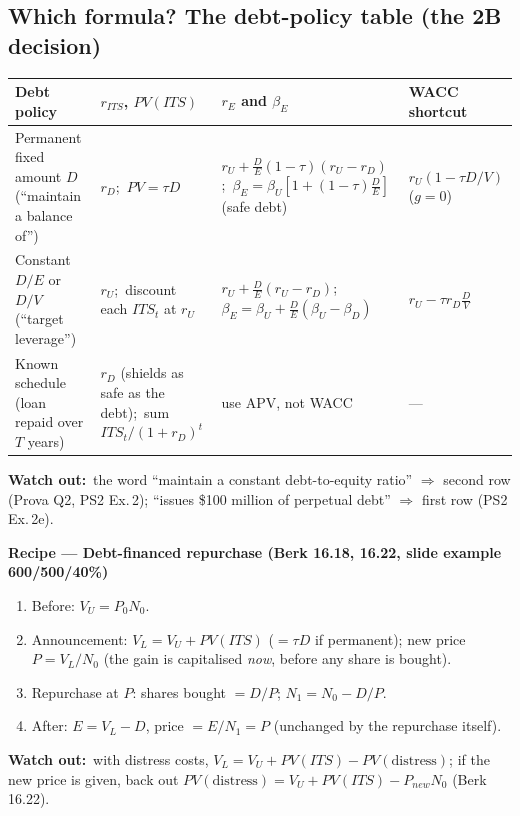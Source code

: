 \documentclass[10pt,a4paper]{article}
\newcommand{\blk}[1]{\subsection*{\color{hd}#1}}
\newcommand{\recipe}[1]{\par\smallskip\noindent\textbf{\color{hd}Recipe --- #1}\par}
\newcommand{\watch}{\par\noindent\textbf{\color{wr}Watch out:}~}
\begin{document}
\blk{Which formula? The debt-policy table (the 2B decision)}
\begin{center}\small
\begin{tabularx}{\linewidth}{@{}>{\raggedright\arraybackslash}p{3.4cm}>{\raggedright\arraybackslash}p{3.6cm}Y>{\raggedright\arraybackslash}p{2.5cm}@{}}
  \toprule
  Debt policy & $r_{ITS}$, $PV(ITS)$ & $r_E$ and $\beta_E$ & WACC shortcut \\ \midrule
  Permanent fixed amount $D$ (``maintain a balance of'') & $r_D$;\ $PV=\tau D$ &
  $r_U+\frac DE(1-\tau)(r_U-r_D)$;\ $\beta_E=\beta_U[1+(1-\tau)\frac DE]$ (safe debt) &
  $r_U(1-\tau D/V)$ ($g=0$) \\[2pt]
  Constant $D/E$ or $D/V$ (``target leverage'') & $r_U$;\ discount each $ITS_t$ at $r_U$ &
  $r_U+\frac DE(r_U-r_D)$;\ $\beta_E=\beta_U+\frac DE(\beta_U-\beta_D)$ &
  $r_U-\tau r_D\frac DV$ \\[2pt]
  Known schedule (loan repaid over $T$ years) & $r_D$ (shields as safe as the debt);\ sum
  $ITS_t/(1+r_D)^t$ & use APV, not WACC & --- \\ \bottomrule
\end{tabularx}
\end{center}
\watch the word ``maintain a constant debt-to-equity ratio'' $\Rightarrow$ second row (Prova Q2, PS2
Ex.\,2); ``issues \$100 million of perpetual debt'' $\Rightarrow$ first row (PS2 Ex.\,2e).

\recipe{Debt-financed repurchase (Berk 16.18, 16.22, slide example 600/500/40\%)}
\begin{enumerate}
  \item Before: $V_U=P_0N_0$.
  \item Announcement: $V_L=V_U+PV(ITS)$ ($=\tau D$ if permanent); new price
        $P=V_L/N_0$ (the gain is capitalised \emph{now}, before any share is bought).
  \item Repurchase at $P$: shares bought $=D/P$; $N_1=N_0-D/P$.
  \item After: $E=V_L-D$, price $=E/N_1=P$ (unchanged by the repurchase itself).
\end{enumerate}
\watch with distress costs, $V_L=V_U+PV(ITS)-PV(\text{distress})$; if the new price is given, back
out $PV(\text{distress})=V_U+PV(ITS)-P_{new}N_0$ (Berk 16.22).
\end{document}
